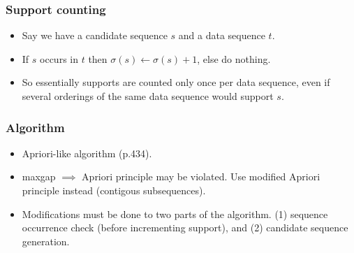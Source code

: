 \documentclass{beamer}
\begin{document}
\begin{frame}
  \frametitle{Support counting}
  \begin{itemize}
    \item{Say we have a candidate sequence $s$ and a data sequence $t$.}
    \item{If $s$ occurs in $t$ then $\sigma(s) \leftarrow \sigma(s) + 1$, else
    do nothing.}
    \item{So essentially supports are counted only once per data sequence, even
    if several orderings of the same data sequence would support $s$.}
  \end{itemize}
\end{frame}

\begin{frame}
  \frametitle{Algorithm}
  \begin{itemize}
    \item{Apriori-like algorithm (p.434).}
    \item{maxgap $\implies$ Apriori principle may be violated. Use modified
    Apriori principle instead (contigous subsequences).}
    \item{Modifications must be done to two parts of the algorithm. (1)
    sequence occurrence check (before incrementing support), and (2) candidate
    sequence generation.}
  \end{itemize}
\end{frame}
\end{document}
